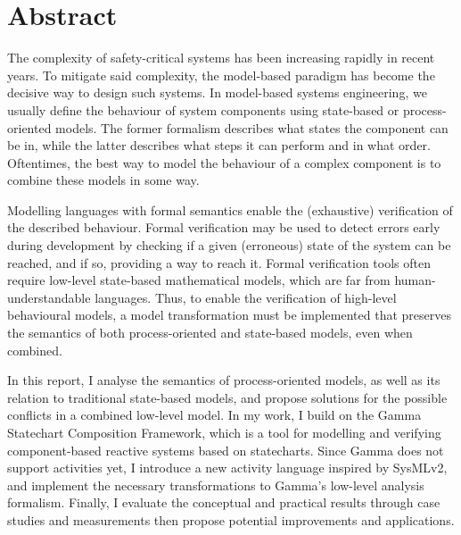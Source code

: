 \vfill
\selectenglish


\chapter*{Abstract}

The complexity of safety-critical systems has been increasing rapidly in recent years. To mitigate said complexity, the model-based paradigm has become the decisive way to design such systems. In model-based systems engineering, we usually define the behaviour of system components using state-based or process-oriented models. The former formalism describes what states the component can be in, while the latter describes what steps it can perform and in what order. Oftentimes, the best way to model the behaviour of a complex component is to combine these models in some way. 

Modelling languages with formal semantics enable the (exhaustive) verification of the described behaviour. Formal verification may be used to detect errors early during development by checking if a given (erroneous) state of the system can be reached, and if so, providing a way to reach it. Formal verification tools often require low-level state-based mathematical models, which are far from human-understandable languages. Thus, to enable the verification of high-level behavioural models, a model transformation must be implemented that preserves the semantics of both process-oriented and state-based models, even when combined.  

In this report, I analyse the semantics of process-oriented models, as well as its relation to traditional state-based models, and propose solutions for the possible conflicts in a combined low-level model. In my work, I build on the Gamma Statechart Composition Framework, which is a tool for modelling and verifying component-based reactive systems based on statecharts. Since Gamma does not support activities yet, I introduce a new activity language inspired by SysMLv2, and implement the necessary transformations to Gamma’s low-level analysis formalism. Finally, I evaluate the conceptual and practical results through case studies and measurements then propose potential improvements and applications. 

\vfill
\cleardoublepage

\selectthesislanguage

\setcounter{romanPage}{\value{page}}
